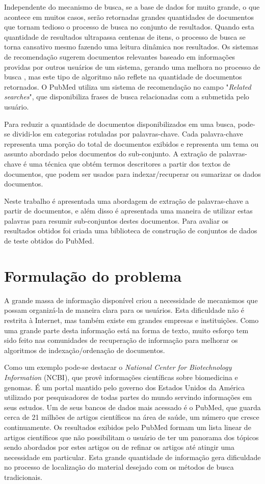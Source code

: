 Independente do mecanismo de busca, se a base de dados for muito grande, o que acontece em muitos casos, serão retornadas grandes quantidades de documentos que tornam tedioso o processo de busca no conjunto de resultados. Quando esta quantidade de resultados ultrapassa centenas de itens, o processo de busca se torna cansativo mesmo fazendo uma leitura dinâmica nos resultados. Os sistemas de recomendação sugerem documentos relevantes baseado em informações providas por outros usuários de um sistema, gerando uma melhora no processo de busca \cite{Jannach2010}, mas este tipo de algoritmo não reflete na quantidade de documentos retornados. O PubMed utiliza um sistema de recomendação no campo "\emph{Related searches}", que disponibiliza frases de busca relacionadas com a submetida pelo usuário.

Para reduzir a quantidade de documentos disponibilizados em uma busca, pode-se dividi-los em categorias rotuladas por palavras-chave. Cada palavra-chave representa uma porção do total de documentos exibidos e representa um tema ou assunto abordado pelos documentos do sub-conjunto. A extração de palavras-chave é uma técnica que obtém termos descritores a partir dos textos de documentos, que podem ser usados para indexar/recuperar ou sumarizar os dados documentos.

Neste trabalho é apresentada uma abordagem de extração de palavras-chave a partir de documentos, e além disso é apresentada uma maneira de utilizar estas palavras para resumir sub-conjuntos destes documentos. Para avaliar os resultados obtidos foi criada uma biblioteca de construção de conjuntos de dados de teste obtidos do PubMed.

\section{Formulação do problema}
A grande massa de informação disponível criou a necessidade de mecanismos que possam organizá-la de maneira clara para os usuários. Esta dificuldade não é restrita à Internet, mas também existe em grandes empresas e instituições. Como uma grande parte desta informação está na forma de texto, muito esforço tem sido feito nas comunidades de recuperação de informação para melhorar os algoritmos de indexação/ordenação de documentos.

Como um exemplo pode-se destacar o \emph{National Center for Biotechnology Information} (NCBI), que provê informações científicas sobre biomedicina e genomas. É um  portal mantido pelo governo dos Estados Unidos da América utilizado por pesquisadores de todas partes do mundo servindo informações em seus estudos. Um de seus bancos de dados mais acessado é o PubMed, que guarda cerca de 21 milhões de artigos científicos na área de saúde, um número que cresce continuamente. Os resultados exibidos pelo PubMed formam um lista linear de artigos científicos que não possibilitam o usuário de ter um panorama dos tópicos sendo abordados por estes artigos ou de refinar os artigos até atingir uma necessidade em particular. Esta grande quantidade de informação gera dificuldade no processo de localização do material desejado com os métodos de busca tradicionais.

